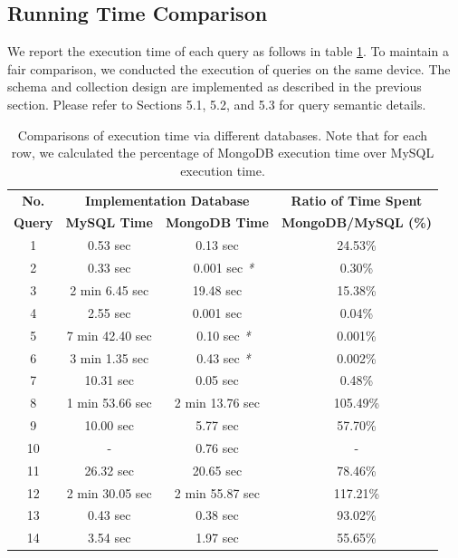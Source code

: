 \documentclass[runningheads]{llncs}
\begin{document}
\subsection{Running Time Comparison}

We report the execution time of each query as follows in table \ref{table:time}. To maintain a fair comparison, we conducted the execution of queries on the same device. The schema and collection design are implemented as described in the previous section. Please refer to Sections 5.1, 5.2, and 5.3 for query semantic details.

\setlength{\tabcolsep}{3pt}
\begin{table}[!h]
\begin{center}
\caption{Comparisons of execution time via different databases. Note that for each row, we calculated the percentage of MongoDB execution time over MySQL execution time.}
\label{table:time}
\begin{tabular}{c|c|c|c}
\hline\noalign{\smallskip}
{\bf No.} & \multicolumn{2}{c|}{\bf Implementation Database} & {\bf Ratio of Time Spent}\\
{\bf Query} & {\bf MySQL Time} & {\bf MongoDB Time}& {\bf MongoDB/MySQL (\%)}\\
\noalign{\smallskip}
\hline
\noalign{\smallskip}
1 & 0.53 sec & 0.13 sec & 24.53\% \\
2 & 0.33 sec & ~~0.001 sec \textit{*} & 0.30\% \\
3 & 2 min 6.45 sec & 19.48 sec & 15.38\% \\
4 & 2.55 sec & 0.001 sec & 0.04\% \\
5 & 7 min 42.40 sec & ~~0.10 sec \textit{*} & 0.001\% \\
6 & 3 min 1.35 sec & ~~0.43 sec \textit{*} & 0.002\% \\
7 & 10.31 sec & 0.05 sec & 0.48\% \\
8 & 1 min 53.66 sec & 2 min 13.76 sec & 105.49\% \\
9 & 10.00 sec & 5.77 sec & 57.70\% \\
10 & - & 0.76 sec & - \\
11 & 26.32 sec & 20.65 sec & 78.46\% \\
12 & 2 min 30.05 sec & 2 min 55.87 sec & 117.21\% \\
13 & 0.43 sec & 0.38 sec & 93.02\% \\
14 & 3.54 sec & 1.97 sec & 55.65\% \\
\hline
\end{tabular}
\end{center}
\end{table}
\setlength{\tabcolsep}{1.4pt}
\end{document}
